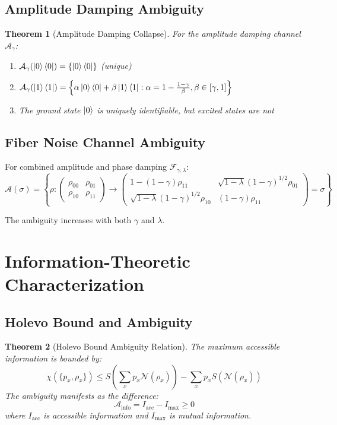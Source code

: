 \documentclass[12pt]{article}
\newtheorem{theorem}{Theorem}
\begin{document}
\subsection{Amplitude Damping Ambiguity}
\begin{theorem}[Amplitude Damping Collapse]
For the amplitude damping channel $\mathcal{A}_\gamma$:
\begin{enumerate}
    \item $\mathcal{A}_\gamma(\ket{0}\bra{0}) = \{\ket{0}\bra{0}\}$ (unique)
    \item $\mathcal{A}_\gamma(\ket{1}\bra{1}) = \left\{\alpha\ket{0}\bra{0} + \beta\ket{1}\bra{1} : \alpha = 1 - \frac{1-\gamma}{\beta}, \beta \in [\gamma, 1]\right\}$
    \item The ground state $\ket{0}$ is uniquely identifiable, but excited states are not
\end{enumerate}
\end{theorem}

\subsection{Fiber Noise Channel Ambiguity}
For combined amplitude and phase damping $\mathcal{F}_{\gamma,\lambda}$:
\begin{equation}
\mathcal{A}(\sigma) = \left\{\rho : \begin{pmatrix}
\rho_{00} & \rho_{01} \\
\rho_{10} & \rho_{11}
\end{pmatrix} \to 
\begin{pmatrix}
1-(1-\gamma)\rho_{11} & \sqrt{1-\lambda}(1-\gamma)^{1/2}\rho_{01} \\
\sqrt{1-\lambda}(1-\gamma)^{1/2}\rho_{10} & (1-\gamma)\rho_{11}
\end{pmatrix} = \sigma \right\}
\end{equation}

The ambiguity increases with both $\gamma$ and $\lambda$.

\section{Information-Theoretic Characterization}

\subsection{Holevo Bound and Ambiguity}
\begin{theorem}[Holevo Bound Ambiguity Relation]
The maximum accessible information is bounded by:
\[
\chi(\{p_x, \rho_x\}) \leq S\left(\sum_x p_x \mathcal{N}(\rho_x)\right) - \sum_x p_x S(\mathcal{N}(\rho_x))
\]
The ambiguity manifests as the difference:
\[
\mathcal{A}_{\text{info}} = I_{\text{acc}} - I_{\text{max}} \geq 0
\]
where $I_{\text{acc}}$ is accessible information and $I_{\text{max}}$ is mutual information.
\end{theorem}
\end{document}
